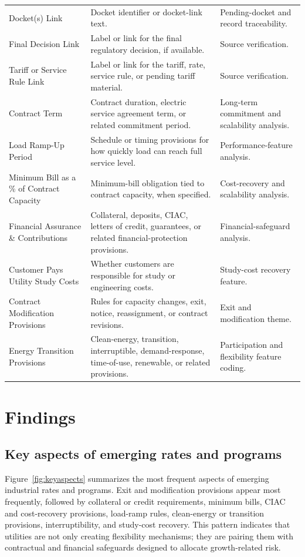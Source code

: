 \documentclass[11pt]{article}
\begin{document}
\begin{longtable}{>{\raggedright\arraybackslash}p{}>{\raggedright\arraybackslash}p{}>{\raggedright\arraybackslash}p{}}
Docket(s) Link & Docket identifier or docket-link text. & Pending-docket and record traceability. \\
Final Decision Link & Label or link for the final regulatory decision, if available. & Source verification. \\
Tariff or Service Rule Link & Label or link for the tariff, rate, service rule, or pending tariff material. & Source verification. \\
Contract Term & Contract duration, electric service agreement term, or related commitment period. & Long-term commitment and scalability analysis. \\
Load Ramp-Up Period & Schedule or timing provisions for how quickly load can reach full service level. & Performance-feature analysis. \\
Minimum Bill as a \% of Contract Capacity & Minimum-bill obligation tied to contract capacity, when specified. & Cost-recovery and scalability analysis. \\
Financial Assurance \& Contributions & Collateral, deposits, CIAC, letters of credit, guarantees, or related financial-protection provisions. & Financial-safeguard analysis. \\
Customer Pays Utility Study Costs & Whether customers are responsible for study or engineering costs. & Study-cost recovery feature. \\
Contract Modification Provisions & Rules for capacity changes, exit, notice, reassignment, or contract revisions. & Exit and modification theme. \\
Energy Transition Provisions & Clean-energy, transition, interruptible, demand-response, time-of-use, renewable, or related provisions. & Participation and flexibility feature coding. \\
\end{longtable}
\normalsize

\section{Findings}
\subsection{Key aspects of emerging rates and programs}
Figure~\ref{fig:keyaspects} summarizes the most frequent aspects of emerging industrial rates and programs. Exit and modification provisions appear most frequently, followed by collateral or credit requirements, minimum bills, CIAC and cost-recovery provisions, load-ramp rules, clean-energy or transition provisions, interruptibility, and study-cost recovery. This pattern indicates that utilities are not only creating flexibility mechanisms; they are pairing them with contractual and financial safeguards designed to allocate growth-related risk.
\end{document}
